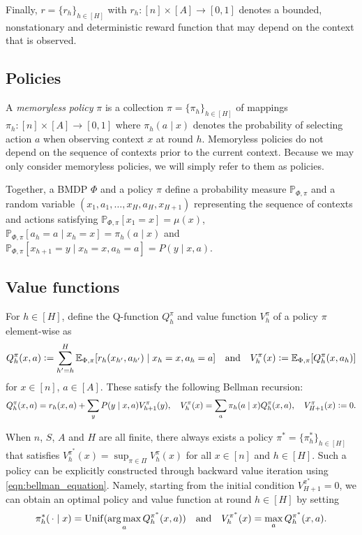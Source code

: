 \documentclass[11pt]{article}
\newcommand{\eqdef}{\vcentcolon=}
\newcommand{\mbbP}{\mathbb{P}}
\newcommand{\mbbE}{\mathbb{E}}
\DeclareMathOperator*{\argmax}{arg\,max}
\theoremstyle{definition}
\theoremstyle{definition}
\begin{document}
Finally, $r = \{r_h\}_{h\in[H]}$ with $r_h:[n]\times[A]\rightarrow [0,1]$ denotes a bounded, nonstationary and deterministic reward function that may depend on the context that is observed.

\subsection{Policies}

A \textit{memoryless policy} $\pi$ is a collection $\pi=\{\pi_h\}_{h\in [H]}$ of mappings $\pi_h:[n]\times[A]\rightarrow [0,1]$ where $\pi_h(a\mid x)$ denotes the probability of selecting action $a$ when observing context $x$ at round $h$.
Memoryless policies do not depend on the sequence of contexts prior to the current context.
Because we may only consider memoryless policies, we will simply refer to them as policies.

Together, a \gls{BMDP} $\Phi$ and a policy $\pi$ define a probability measure $\mbbP_{\Phi,\pi}$ and a random variable $(x_1,a_1,\ldots,x_H,a_H,x_{H+1})$ representing the sequence of contexts and actions satisfying $\mbbP_{\Phi,\pi}[x_1=x]=\mu(x)$, $\mbbP_{\Phi,\pi}[a_h=a\mid x_h=x]=\pi_h(a\mid x)$ and $\mbbP_{\Phi,\pi}[x_{h+1}=y\mid x_h=x,a_h=a]=P(y\mid x,a)$.


\subsection{Value functions}

For $h\in[H]$, define the Q-function $Q^{\pi}_h$ and value function $V^{\pi}_h$ of a policy $\pi$ element-wise as
\begin{equation}
	\label{eqn:valuefuncdef}
	Q^{\pi}_h(x,a)
	\eqdef
	\sum_{h'=h}^H
	\mbbE_{\Phi,\pi}[
	r_h(x_{h'},a_{h'}) \mid x_h=x, a_h = a
	]
	\quad
	\mathrm{and}
	\quad
	V^{\pi}_h(x)
	\eqdef
	\mbbE_{\Phi,\pi}[Q_h^{\pi}(x,a_h)]
\end{equation}
for $x\in[n]$, $a\in[A]$.
These satisfy the following Bellman recursion:
\begin{equation}
	\label{eqn:bellman_equation}
	Q^{\pi}_h(x,a) = r_h(x,a) + \sum_{y}P(y\mid x,a)V_{h+1}^{\pi}(y)
	,
	\quad
	V_h^{\pi}(x) = \sum_{a}\pi_h(a\mid x)Q_h^{\pi}(x,a)
	,
	\quad
	V_{H+1}^{\pi}(x) \eqdef 0
	.
\end{equation}

When $n$, $S$, $A$ and $H$ are all finite, there always exists a policy $\pi^*=\{\pi_h^*\}_{h\in[H]}$ that satisfies $V_h^{\pi^*}(x)=\sup_{\pi\in\Pi}V^{\pi}_h(x)$ for all $x\in[n]$ and $h\in[H]$.
Such a policy can be explicitly constructed through backward value iteration using \eqref{eqn:bellman_equation}.
Namely, starting from the initial condition $V_{H+1}^{\pi^*}=0$, we can obtain an optimal policy and value function at round $h\in[H]$ by setting
\begin{equation}
	\label{eqn:backward_value_iteration}
	\pi_h^*(\,\cdot\mid x)
	=
	\mathrm{Unif}(\argmax_{a}Q_h^{\pi^*}(x,a))
	\quad
	\textnormal{and}
	\quad
	V_h^{\pi^*}(x)
	=
	\max_{a}Q_{h}^{\pi^*}(x,a)
	.
\end{equation}
\end{document}
